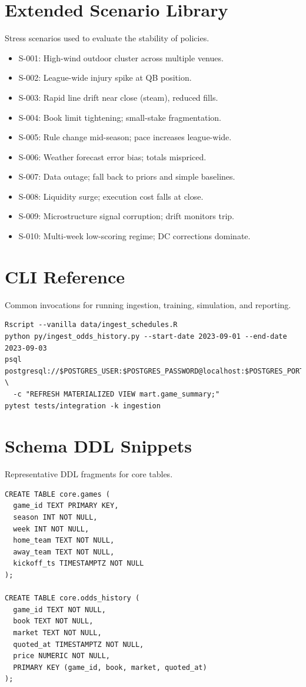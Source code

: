 \documentclass[12pt]{report}  %
\numberwithin{equation}{section}
\theoremstyle{plain}
\theoremstyle{definition}
\theoremstyle{remark}
\begin{document}
\chapter{Extended Scenario Library}
Stress scenarios used to evaluate the stability of policies.
\begin{itemize}
  \item S-001: High-wind outdoor cluster across multiple venues.
  \item S-002: League-wide injury spike at QB position.
  \item S-003: Rapid line drift near close (steam), reduced fills.
  \item S-004: Book limit tightening; small-stake fragmentation.
  \item S-005: Rule change mid-season; pace increases league-wide.
  \item S-006: Weather forecast error bias; totals mispriced.
  \item S-007: Data outage; fall back to priors and simple baselines.
  \item S-008: Liquidity surge; execution cost falls at close.
  \item S-009: Microstructure signal corruption; drift monitors trip.
  \item S-010: Multi-week low-scoring regime; DC corrections dominate.
\end{itemize}

\chapter{CLI Reference}
Common invocations for running ingestion, training, simulation, and reporting.
\begin{verbatim}
Rscript --vanilla data/ingest_schedules.R
python py/ingest_odds_history.py --start-date 2023-09-01 --end-date 2023-09-03
psql postgresql://$POSTGRES_USER:$POSTGRES_PASSWORD@localhost:$POSTGRES_PORT/$POSTGRES_DB \
  -c "REFRESH MATERIALIZED VIEW mart.game_summary;"
pytest tests/integration -k ingestion
\end{verbatim}

\chapter{Schema DDL Snippets}
Representative DDL fragments for core tables.
\begin{verbatim}
CREATE TABLE core.games (
  game_id TEXT PRIMARY KEY,
  season INT NOT NULL,
  week INT NOT NULL,
  home_team TEXT NOT NULL,
  away_team TEXT NOT NULL,
  kickoff_ts TIMESTAMPTZ NOT NULL
);

CREATE TABLE core.odds_history (
  game_id TEXT NOT NULL,
  book TEXT NOT NULL,
  market TEXT NOT NULL,
  quoted_at TIMESTAMPTZ NOT NULL,
  price NUMERIC NOT NULL,
  PRIMARY KEY (game_id, book, market, quoted_at)
);
\end{verbatim}
\end{document}
